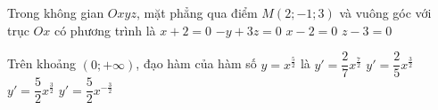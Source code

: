 \begin{ex}%
	Trong không gian $Oxyz$, mặt phẳng qua điểm $M(2;-1;3)$ và vuông góc với trục $Ox$ có phương trình là
	\choice
	{$x+2=0$}
	{$-y+3z=0$}
	{\True $x-2=0$}
	{$z-3=0$}
\end{ex}
\begin{ex}%
	Trên khoảng $(0;+\infty)$, đạo hàm của hàm số $y=x^{\frac{5}{2}}$ là
	\choice
	{$y'=\dfrac{2}{7}x^{\frac{7}{2}}$}
	{$y'=\dfrac{2}{5}x^{\frac{3}{2}}$}
	{\True $y'=\dfrac{5}{2}x^{\frac{3}{2}}$}
	{$y'=\dfrac{5}{2}x^{-\frac{3}{2}}$}
\end{ex}



